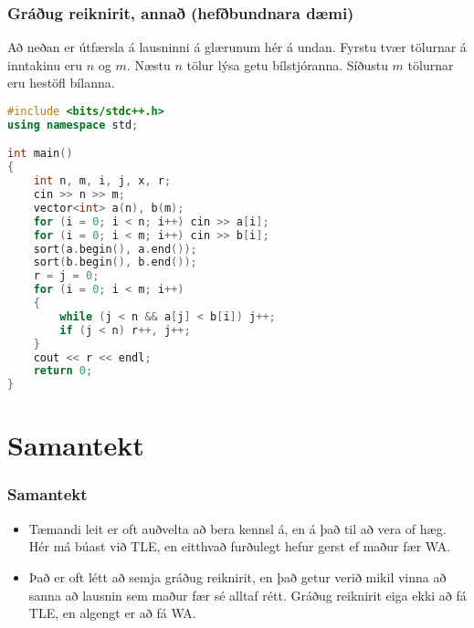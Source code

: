 \documentclass{beamer}
\begin{document}
\begin{frame}[fragile]
	\frametitle{Gráðug reiknirit, annað (hefðbundnara dæmi)}
\tiny
Að neðan er útfærsla á lausninni á glærunum hér á undan. Fyrstu tvær tölurnar á inntakinu eru $n$ og $m$. 
Næstu $n$ tölur lýsa getu bílstjóranna.
Síðustu $m$ tölurnar eru hestöfl bílanna.
\begin{lstlisting}[language=C++]
#include <bits/stdc++.h>
using namespace std;

int main()
{
	int n, m, i, j, x, r;
	cin >> n >> m;
	vector<int> a(n), b(m);
	for (i = 0; i < n; i++) cin >> a[i];
	for (i = 0; i < m; i++) cin >> b[i];
	sort(a.begin(), a.end());
	sort(b.begin(), b.end());
	r = j = 0;
	for (i = 0; i < m; i++)
	{
		while (j < n && a[j] < b[i]) j++;
		if (j < n) r++, j++;
	}
	cout << r << endl;
	return 0;
}
\end{lstlisting}
\end{frame}

\section{Samantekt}
\begin{frame}
\frametitle{Samantekt}
\begin{itemize}
	\item<1-> Tæmandi leit er oft auðvelta að bera kennsl á, en á það til að vera of hæg. 
		Hér má búast við TLE, en eitthvað furðulegt hefur gerst ef maður fær WA.
	\item<2-> Það er oft létt að semja gráðug reiknirit, en það getur verið mikil vinna að sanna að lausnin sem maður fær sé alltaf rétt.
		Gráðug reiknirit eiga ekki að fá TLE, en algengt er að fá WA.
\end{itemize}
\end{frame}
\end{document}
